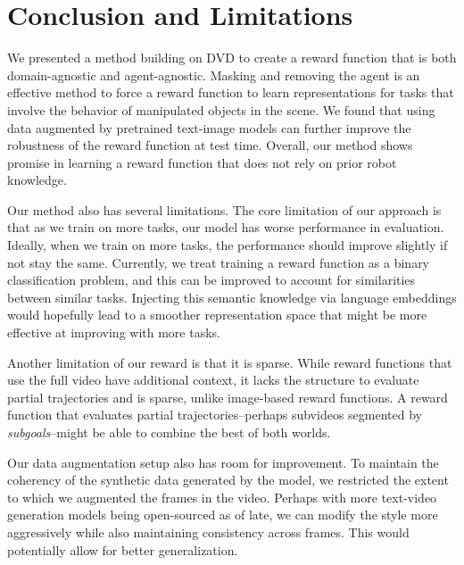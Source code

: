 \section{Conclusion and Limitations}
\label{sec:conclusions_reward}

We presented a method building on DVD \cite{DVD} to create a reward function that is both domain-agnostic and agent-agnostic. Masking and removing the agent is an effective method to force a reward function to learn representations for tasks that involve the behavior of manipulated objects in the scene. We found that using data augmented by pretrained text-image models can further improve the robustness of the reward function at test time. Overall, our method shows promise in learning a reward function that does not rely on prior robot knowledge.

Our method also has several limitations. The core limitation of our approach is that as we train on more tasks, our model has worse performance in evaluation. Ideally, when we train on more tasks, the performance should improve slightly if not stay the same. Currently, we treat training a reward function as a binary classification problem, and this can be improved to account for similarities between similar tasks. Injecting this semantic knowledge via language embeddings would hopefully lead to a smoother representation space that might be more effective at improving with more tasks.

Another limitation of our reward is that it is sparse. While reward functions that use the full video have additional context, it lacks the structure to evaluate partial trajectories and is sparse, unlike image-based reward functions. A reward function that evaluates partial trajectories--perhaps subvideos segmented by \textit{subgoals}--might be able to combine the best of both worlds.

Our data augmentation setup also has room for improvement. To maintain the coherency of the synthetic data generated by the model, we restricted the extent to which we augmented the frames in the video. Perhaps with more text-video generation models being open-sourced as of late, we can modify the style more aggressively while also maintaining consistency across frames. This would potentially allow for better generalization.